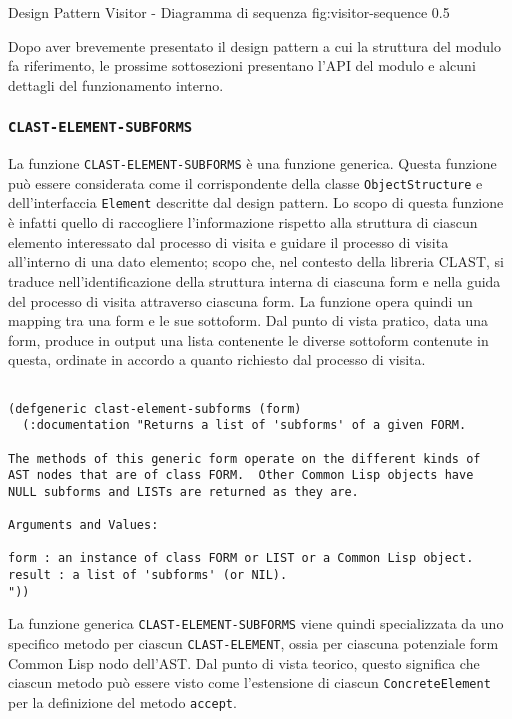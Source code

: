       {Design Pattern Visitor - Diagramma di sequenza}
      {fig:visitor-sequence}
      {0.5}

Dopo aver brevemente presentato il design pattern a cui la struttura del
modulo fa riferimento, le prossime sottosezioni presentano l'API del modulo e
alcuni dettagli del funzionamento interno.

\subsubsection{\texttt{CLAST-ELEMENT-SUBFORMS}}

La funzione \texttt{CLAST-ELEMENT-SUBFORMS} è una funzione generica. Questa
funzione può essere considerata come il corrispondente della classe
\texttt{ObjectStructure} e dell'interfaccia \texttt{Element} descritte dal
design pattern. Lo scopo di questa funzione è infatti quello di raccogliere
l'informazione rispetto alla struttura di ciascun elemento interessato dal
processo di visita e guidare il processo di visita all'interno di una dato
elemento; scopo che, nel contesto della libreria CLAST, si traduce
nell'identificazione della struttura interna di ciascuna form e nella guida
del processo di visita attraverso ciascuna form. La funzione opera quindi un
mapping tra una form e le sue sottoform. Dal punto di vista pratico, data una
form, produce in output una lista contenente le diverse sottoform contenute in
questa, ordinate in accordo a quanto richiesto dal processo di visita.

\begin{lstlisting}[caption=Definizione della funzione \texttt
{CLAST-ELEMENT-SUBFORMS}]

(defgeneric clast-element-subforms (form)
  (:documentation "Returns a list of 'subforms' of a given FORM.

The methods of this generic form operate on the different kinds of
AST nodes that are of class FORM.  Other Common Lisp objects have
NULL subforms and LISTs are returned as they are.

Arguments and Values:

form : an instance of class FORM or LIST or a Common Lisp object.
result : a list of 'subforms' (or NIL).
"))

\end{lstlisting}

La funzione generica \texttt{CLAST-ELEMENT-SUBFORMS} viene quindi specializzata
da uno specifico metodo per ciascun \texttt{CLAST-ELEMENT}, ossia per ciascuna
potenziale form Common Lisp nodo dell'AST. Dal punto di vista teorico, questo
significa che ciascun metodo può essere visto come l'estensione di ciascun
\texttt{ConcreteElement} per la definizione del metodo \texttt{accept}.\\

